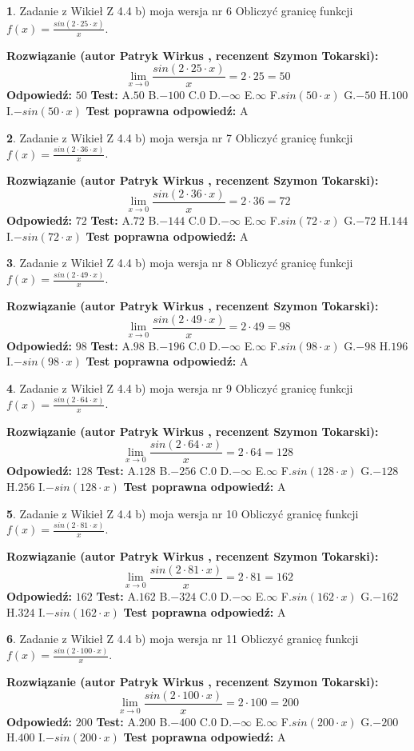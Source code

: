 \documentclass[12pt, a4paper]{article}
\theoremstyle{definition} %
\newtheorem{zad}{}
\newcommand{\zadStart}[1]{\begin{zad}#1\newline}
\newcommand{\zadStop}{\end{zad}}
\newcommand{\rozwStart}[2]{\noindent \textbf{Rozwiązanie (autor #1 , recenzent #2): }\newline}
\newcommand{\rozwStop}{\newline}
\newcommand{\odpStart}{\noindent \textbf{Odpowiedź:}\newline}
\newcommand{\odpStop}{\newline}
\newcommand{\testStart}{\noindent \textbf{Test:}\newline}
\newcommand{\testStop}{\newline}
\newcommand{\kluczStart}{\noindent \textbf{Test poprawna odpowiedź:}\newline}
\newcommand{\kluczStop}{\newline}
\begin{document}
\zadStart{Zadanie z Wikieł Z 4.4 b) moja wersja nr 6}
Obliczyć granicę funkcji $f(x)=\frac{sin(2 \cdot25\cdot x)}{x}$.
\zadStop
\rozwStart{Patryk Wirkus}{Szymon Tokarski}
$$\lim\limits_{x\to 0}\frac{sin(2 \cdot 25\cdot x)}{x}=
2 \cdot 25 = 50$$
\rozwStop
\odpStart
$50$
\odpStop
\testStart
A.$50$
B.$-100$
C.$0$
D.$-\infty$
E.$\infty$
F.$sin(50\cdot x)$
G.$-50$
H.$100$
I.$-sin(50\cdot x)$
\testStop
\kluczStart
A
\kluczStop



\zadStart{Zadanie z Wikieł Z 4.4 b) moja wersja nr 7}
Obliczyć granicę funkcji $f(x)=\frac{sin(2 \cdot36\cdot x)}{x}$.
\zadStop
\rozwStart{Patryk Wirkus}{Szymon Tokarski}
$$\lim\limits_{x\to 0}\frac{sin(2 \cdot 36\cdot x)}{x}=
2 \cdot 36 = 72$$
\rozwStop
\odpStart
$72$
\odpStop
\testStart
A.$72$
B.$-144$
C.$0$
D.$-\infty$
E.$\infty$
F.$sin(72\cdot x)$
G.$-72$
H.$144$
I.$-sin(72\cdot x)$
\testStop
\kluczStart
A
\kluczStop



\zadStart{Zadanie z Wikieł Z 4.4 b) moja wersja nr 8}
Obliczyć granicę funkcji $f(x)=\frac{sin(2 \cdot49\cdot x)}{x}$.
\zadStop
\rozwStart{Patryk Wirkus}{Szymon Tokarski}
$$\lim\limits_{x\to 0}\frac{sin(2 \cdot 49\cdot x)}{x}=
2 \cdot 49 = 98$$
\rozwStop
\odpStart
$98$
\odpStop
\testStart
A.$98$
B.$-196$
C.$0$
D.$-\infty$
E.$\infty$
F.$sin(98\cdot x)$
G.$-98$
H.$196$
I.$-sin(98\cdot x)$
\testStop
\kluczStart
A
\kluczStop



\zadStart{Zadanie z Wikieł Z 4.4 b) moja wersja nr 9}
Obliczyć granicę funkcji $f(x)=\frac{sin(2 \cdot64\cdot x)}{x}$.
\zadStop
\rozwStart{Patryk Wirkus}{Szymon Tokarski}
$$\lim\limits_{x\to 0}\frac{sin(2 \cdot 64\cdot x)}{x}=
2 \cdot 64 = 128$$
\rozwStop
\odpStart
$128$
\odpStop
\testStart
A.$128$
B.$-256$
C.$0$
D.$-\infty$
E.$\infty$
F.$sin(128\cdot x)$
G.$-128$
H.$256$
I.$-sin(128\cdot x)$
\testStop
\kluczStart
A
\kluczStop



\zadStart{Zadanie z Wikieł Z 4.4 b) moja wersja nr 10}
Obliczyć granicę funkcji $f(x)=\frac{sin(2 \cdot81\cdot x)}{x}$.
\zadStop
\rozwStart{Patryk Wirkus}{Szymon Tokarski}
$$\lim\limits_{x\to 0}\frac{sin(2 \cdot 81\cdot x)}{x}=
2 \cdot 81 = 162$$
\rozwStop
\odpStart
$162$
\odpStop
\testStart
A.$162$
B.$-324$
C.$0$
D.$-\infty$
E.$\infty$
F.$sin(162\cdot x)$
G.$-162$
H.$324$
I.$-sin(162\cdot x)$
\testStop
\kluczStart
A
\kluczStop



\zadStart{Zadanie z Wikieł Z 4.4 b) moja wersja nr 11}
Obliczyć granicę funkcji $f(x)=\frac{sin(2 \cdot100\cdot x)}{x}$.
\zadStop
\rozwStart{Patryk Wirkus}{Szymon Tokarski}
$$\lim\limits_{x\to 0}\frac{sin(2 \cdot 100\cdot x)}{x}=
2 \cdot 100 = 200$$
\rozwStop
\odpStart
$200$
\odpStop
\testStart
A.$200$
B.$-400$
C.$0$
D.$-\infty$
E.$\infty$
F.$sin(200\cdot x)$
G.$-200$
H.$400$
I.$-sin(200\cdot x)$
\testStop
\kluczStart
A
\kluczStop
\end{document}
